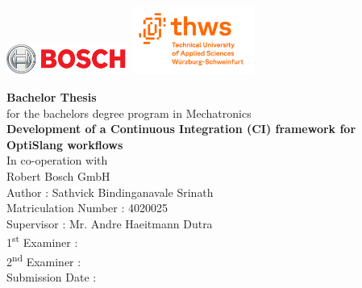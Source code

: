 \begin{titlepage}
    \par
    \includegraphics[width=0.3\textwidth, valign=M]{Logo/bosch_logo.png}
    \hfill
    \includegraphics[width=0.3\textwidth,valign=M]{Logo/Thws-logo_English.png}
    \par
    \vspace{3cm}
    \begin{center}
         \textbf{\Huge Bachelor Thesis}
         \vspace{5pt}
         \\
         for the bachelors degree program in Mechatronics
         \vspace{2.5cm}
         \\
         \textbf{\Huge Development of a Continuous Integration (CI) framework for OptiSlang workflows}
         \vspace{2cm}
         \\
         In co-operation with
         \vspace{5pt}
         \\
         Robert Bosch GmbH
         \vspace{2cm}
         \\
         Author : Sathvick Bindinganavale Srinath\\
         Matriculation Number : 4020025
         \vspace{1cm}\\
         Supervisor : Mr. Andre Haeitmann Dutra \\
         1\textsuperscript{st} Examiner : \\
         2\textsuperscript{nd} Examiner :
         \vspace{1cm} \\
         Submission Date : 
    \end{center}
\end{titlepage}